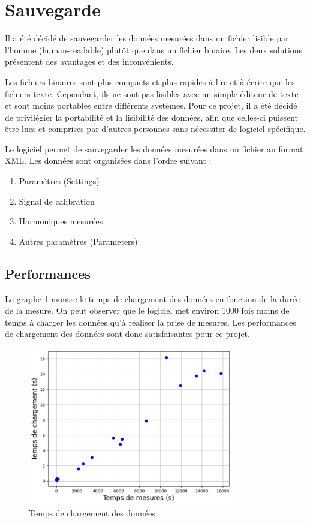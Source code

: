\section{Sauvegarde}

Il a été décidé de sauvegarder les données mesurées dans un fichier lisible par l'homme (human-readable) plutôt que dans un fichier binaire.  
Les deux solutions présentent des avantages et des inconvénients.

Les fichiers binaires sont plus compacts et plus rapides à lire et à écrire que les fichiers texte. Cependant, ils ne sont pas lisibles avec un simple éditeur de texte et sont moins portables entre différents systèmes.  
Pour ce projet, il a été décidé de privilégier la portabilité et la lisibilité des données, afin que celles-ci puissent être lues et comprises par d'autres personnes sans nécessiter de logiciel spécifique.

Le logiciel permet de sauvegarder les données mesurées dans un fichier au format XML.  
Les données sont organisées dans l'ordre suivant :
\begin{enumerate}
    \item Paramètres (Settings)
    \item Signal de calibration
    \item Harmoniques mesurées
    \item Autres paramètres (Parameters)
\end{enumerate}

\subsection{Performances}

Le graphe \ref{fig:LoadingPerformance} montre le temps de chargement des données en fonction de la durée de la mesure.  
On peut observer que le logiciel met environ 1000 fois moins de temps à charger les données qu'à réaliser la prise de mesures.  
Les performances de chargement des données sont donc satisfaisantes pour ce projet.

\begin{figure}[H]
    \centering
    \includegraphics[width=0.8\textwidth]{assets/figures/LoadingPerformance.png}
    \caption{Temps de chargement des données}
    \label{fig:LoadingPerformance}
\end{figure}

